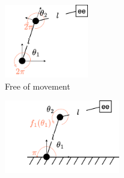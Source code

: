 \newcommand{\panelheight}{3.2cm}  %

\begin{figure}
    \centering
    \begin{subfigure}[t]{0.32\linewidth}
        \centering
        \includegraphics[width=\linewidth,height=\panelheight,keepaspectratio]{figures/ch2/ch2-planar-manipulator-free.png}
        \caption{Free of movement}
        \label{fig:planar-manipulation-simple}
    \end{subfigure}\hfill
    \begin{subfigure}[t]{0.32\linewidth}
        \centering
        \includegraphics[width=\linewidth,height=\panelheight,keepaspectratio]{figures/ch2/ch2-planar-manipulator-floor.png}

\end{subfigure}
\end{figure}
